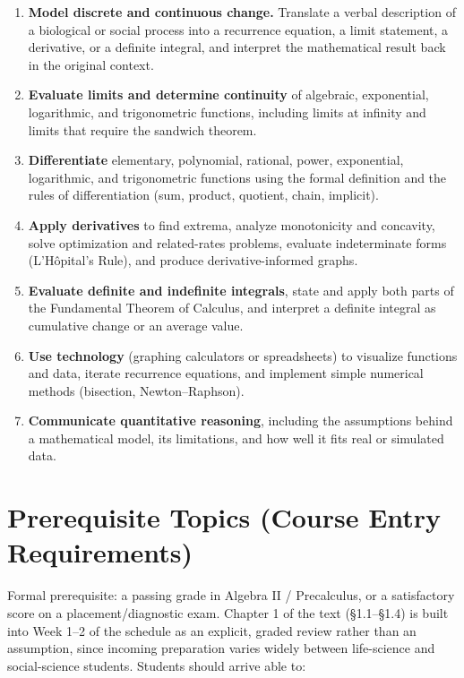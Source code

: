 \documentclass[11pt]{article}
\begin{document}
\begin{enumerate}[label=\textbf{SLO\arabic*.}, leftmargin=2.6em]
\item \textbf{Model discrete and continuous change.} Translate a verbal description of a
      biological or social process into a recurrence equation, a limit statement, a
      derivative, or a definite integral, and interpret the mathematical result back in
      the original context.
\item \textbf{Evaluate limits and determine continuity} of algebraic, exponential,
      logarithmic, and trigonometric functions, including limits at infinity and limits
      that require the sandwich theorem.
\item \textbf{Differentiate} elementary, polynomial, rational, power, exponential,
      logarithmic, and trigonometric functions using the formal definition and the rules
      of differentiation (sum, product, quotient, chain, implicit).
\item \textbf{Apply derivatives} to find extrema, analyze monotonicity and concavity,
      solve optimization and related-rates problems, evaluate indeterminate forms
      (L'H\^{o}pital's Rule), and produce derivative-informed graphs.
\item \textbf{Evaluate definite and indefinite integrals}, state and apply both parts of
      the Fundamental Theorem of Calculus, and interpret a definite integral as
      cumulative change or an average value.
\item \textbf{Use technology} (graphing calculators or spreadsheets) to visualize
      functions and data, iterate recurrence equations, and implement simple numerical
      methods (bisection, Newton--Raphson).
\item \textbf{Communicate quantitative reasoning}, including the assumptions behind a
      mathematical model, its limitations, and how well it fits real or simulated data.
\end{enumerate}

\section{Prerequisite Topics (Course Entry Requirements)}
\label{sec:prereq}

Formal prerequisite: a passing grade in Algebra II / Precalculus, or a satisfactory score
on a placement/diagnostic exam. Chapter 1 of the text (\S1.1--\S1.4) is built into Week 1--2
of the schedule as an explicit, graded review rather than an assumption, since incoming
preparation varies widely between life-science and social-science students. Students should
arrive able to:
\end{document}
